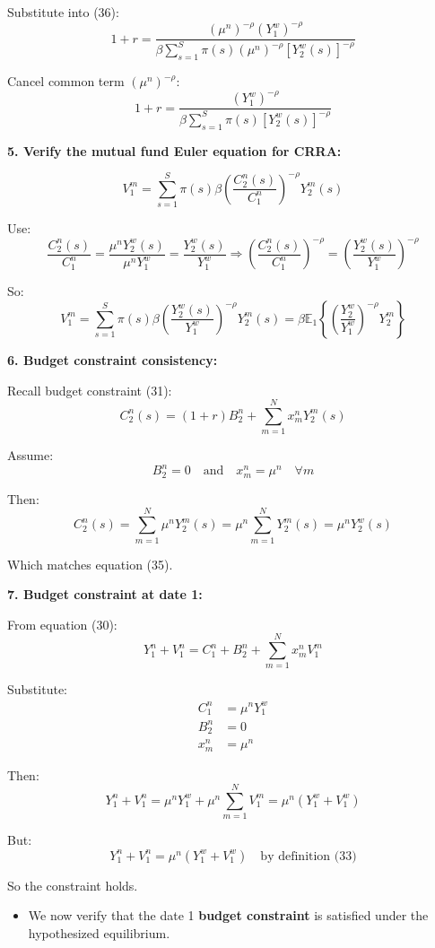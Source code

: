 \documentclass[12pt]{article}
\begin{document}
\begin{itemize}
{Substitute into (36):
\[
1 + r = \frac{(\mu^n)^{-\rho} (Y_1^w)^{-\rho}}{\beta \sum_{s=1}^{S} \pi(s)(\mu^n)^{-\rho} [Y_2^w(s)]^{-\rho}}
\]

Cancel common term \( (\mu^n)^{-\rho} \):
\[
1 + r = \frac{(Y_1^w)^{-\rho}}{\beta \sum_{s=1}^{S} \pi(s)[Y_2^w(s)]^{-\rho}} \tag{37}
\]

\textbf{5. Verify the mutual fund Euler equation for CRRA:}

\[
V_1^m = \sum_{s=1}^{S} \pi(s) \beta \left( \frac{C_2^n(s)}{C_1^n} \right)^{-\rho} Y_2^m(s)
\]

Use:
\[
\frac{C_2^n(s)}{C_1^n} = \frac{\mu^n Y_2^w(s)}{\mu^n Y_1^w} = \frac{Y_2^w(s)}{Y_1^w}
\Rightarrow \left( \frac{C_2^n(s)}{C_1^n} \right)^{-\rho} = \left( \frac{Y_2^w(s)}{Y_1^w} \right)^{-\rho}
\]

So:
\[
V_1^m = \sum_{s=1}^{S} \pi(s) \beta \left( \frac{Y_2^w(s)}{Y_1^w} \right)^{-\rho} Y_2^m(s)
= \beta \mathbb{E}_1 \left\{ \left( \frac{Y_2^w}{Y_1^w} \right)^{-\rho} Y_2^m \right\}
\]

\textbf{6. Budget constraint consistency:}

Recall budget constraint (31):
\[
C_2^n(s) = (1 + r)B_2^n + \sum_{m=1}^{N} x_m^n Y_2^m(s)
\]

Assume:
\[
B_2^n = 0 \quad \text{and} \quad x_m^n = \mu^n \quad \forall m
\]

Then:
\[
C_2^n(s) = \sum_{m=1}^{N} \mu^n Y_2^m(s) = \mu^n \sum_{m=1}^{N} Y_2^m(s) = \mu^n Y_2^w(s)
\]

Which matches equation (35). 

\textbf{7. Budget constraint at date 1:}

From equation (30):
\[
Y_1^n + V_1^n = C_1^n + B_2^n + \sum_{m=1}^{N} x_m^n V_1^m
\]

Substitute:
\begin{align*}
C_1^n &= \mu^n Y_1^w \\
B_2^n &= 0 \\
x_m^n &= \mu^n
\end{align*}

Then:
\[
Y_1^n + V_1^n = \mu^n Y_1^w + \mu^n \sum_{m=1}^{N} V_1^m = \mu^n (Y_1^w + V_1^w)
\]

But:
\[
Y_1^n + V_1^n = \mu^n (Y_1^w + V_1^w) \quad \text{by definition (33)}
\]

So the constraint holds. 

}

\begin{itemize}
    \item We now verify that the date 1 \textbf{budget constraint} is satisfied under the hypothesized equilibrium.


\end{itemize}
\end{itemize}
\end{document}

